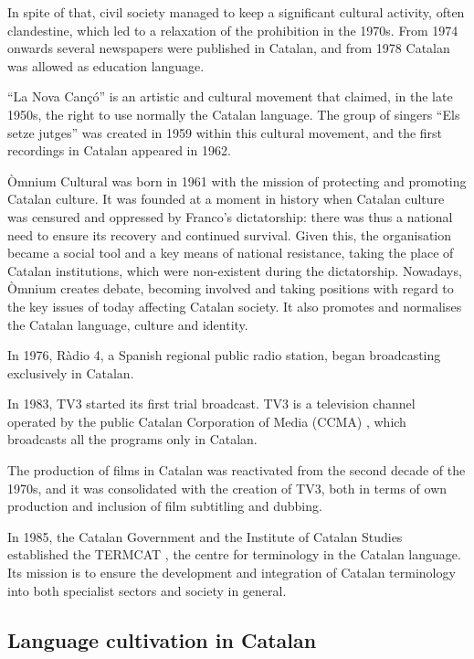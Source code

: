 \documentclass[]{../../metanetpaper}
\begin{document}
\begin{multicols}{2}
In spite of that, civil society managed to keep a significant cultural activity, often clandestine, which led to a relaxation of the prohibition in the 1970s. From 1974 onwards several newspapers were published in Catalan, and from 1978 Catalan was allowed as education language.

 “La Nova Cançó” is an artistic and cultural movement that claimed, in the late 1950s, the right to use normally the Catalan language. The group of singers “Els setze jutges” was created in 1959 within this cultural movement, and the first recordings in Catalan appeared in 1962.

Òmnium Cultural \cite{CAT-omniumcultural} was born in 1961 with the mission of protecting and promoting Catalan culture. It was founded at a moment in history when Catalan culture was censured and oppressed by Franco’s dictatorship: there was thus a national need to ensure its recovery and continued survival. Given this, the organisation became a social tool and a key means of national resistance, taking the place of Catalan institutions, which were non-existent during the dictatorship. Nowadays, Òmnium creates debate, becoming involved and taking positions with regard to the key issues of today affecting Catalan society. It also promotes and normalises the Catalan language, culture and identity.

In 1976, Ràdio 4, a Spanish regional public radio station, began broadcasting exclusively in Catalan.

In 1983, TV3 started its first trial broadcast. TV3 is a television channel operated by the public Catalan Corporation of Media (CCMA) \cite{CAT-CCMA}, which broadcasts all the programs only in Catalan.

The production of films in Catalan was reactivated from the second decade of the 1970s, and it was consolidated with the creation of TV3, both in terms of own production and inclusion of film subtitling and dubbing.

In 1985, the Catalan Government and the Institute of Catalan Studies established the TERMCAT \cite{CAT-TERMCAT}, the centre for terminology in the Catalan language. Its mission is to ensure the development and integration of Catalan terminology into both specialist sectors and society in general.

\subsection{Language cultivation in Catalan}


\end{multicols}
\end{document}
